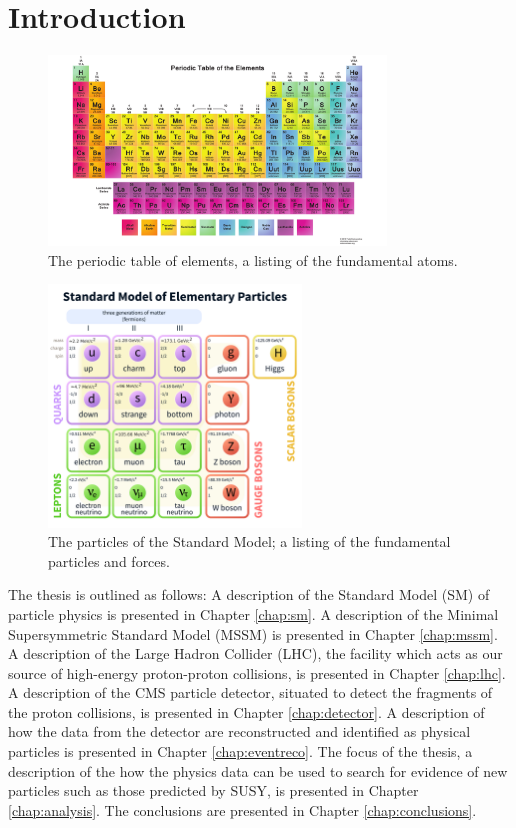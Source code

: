 \chapter{Introduction}

\begin{figure}[hb!]
\centering
\includegraphics[width=0.8\textwidth]{figs/PeriodicTable.pdf}
\caption{The periodic table of elements, a listing of the fundamental atoms.}
\label{fig:periodictable}
\end{figure}

\begin{figure}[hb!]
\centering
\includegraphics[width=0.6\textwidth]{figs/StandardModelofElementaryParticles.pdf}
\caption{The particles of the Standard Model; a listing of the fundamental particles and forces.}
\label{fig:sm}
\end{figure}

The thesis is outlined as follows: A description of the Standard Model (SM) of particle physics is presented in Chapter \ref{chap:sm}. A description of the Minimal Supersymmetric Standard Model (MSSM) is presented in Chapter \ref{chap:mssm}. A description of the Large Hadron Collider (LHC), the facility which acts as our source of high-energy proton-proton collisions, is presented in Chapter \ref{chap:lhc}. A description of the CMS particle detector, situated to detect the fragments of the proton collisions, is presented in Chapter \ref{chap:detector}. A description of how the data from the detector are reconstructed and identified as physical particles is presented in Chapter \ref{chap:eventreco}. The focus of the thesis, a description of the how the physics data can be used to search for evidence of new particles such as those predicted by SUSY, is presented in Chapter \ref{chap:analysis}. The conclusions are presented in Chapter \ref{chap:conclusions}.

